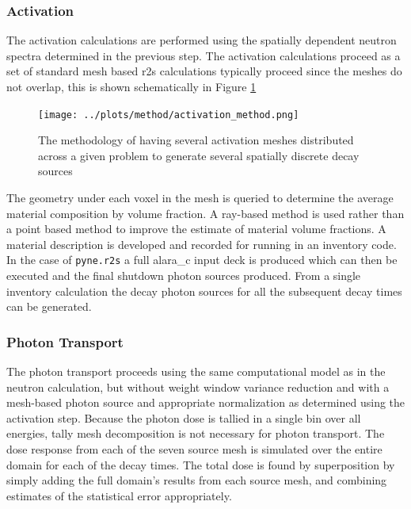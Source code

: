 \documentclass[12pt]{article}
\begin{document}
\subsubsection{Activation}
The activation calculations are performed using the spatially dependent neutron
spectra determined in the previous step. The activation calculations proceed as
a set of standard mesh based \gls{r2s} calculations typically proceed since the 
meshes do not overlap, this is shown schematically in Figure
\ref{fig:activation_method}
\begin{figure}[ht!]
  \centering
  \texttt{[image: ../plots/method/activation\_method.png]}
  \caption{The methodology of having several activation meshes distributed
           across a given problem to generate several spatially discrete
           decay sources}
  \label{fig:activation_method}
\end{figure}
The geometry under each voxel in the mesh is queried to 
determine the average material composition by volume fraction.  A ray-based
method is used rather than a point based method to improve the estimate of material
volume fractions.  A material 
description is developed and recorded for running in an inventory code. In the 
case of \texttt{pyne.r2s} a full \gls{alara_c} input deck is produced which can
then be executed and the final shutdown photon sources produced. From a single
inventory calculation the decay photon sources for all the subsequent decay
times can be generated.  

\subsubsection{Photon Transport}
\label{sec:phtn_trans_method}
The photon transport proceeds using the same computational model as in the
neutron calculation, but without weight window variance reduction and with a
mesh-based photon source and appropriate normalization as determined using the
activation step.  Because the photon dose is tallied in a single bin over all
energies, tally mesh decomposition is not necessary for photon transport.  The
dose response from each of the seven source mesh is simulated over the entire
domain for each of the decay times.  The total dose is found by superposition
by simply adding the full domain's results from each source mesh, and
combining estimates of the statistical error appropriately.
\end{document}
